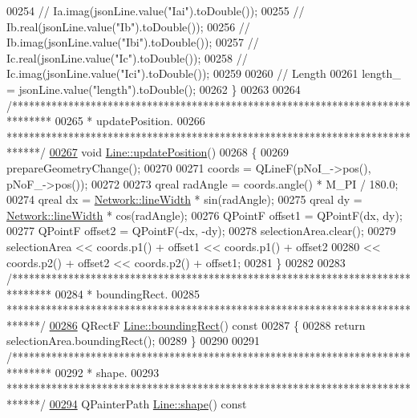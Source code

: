 \begin{DoxyCode}
00254 \textcolor{comment}{//  Ia.imag(jsonLine.value("Iai").toDouble());}
00255 \textcolor{comment}{//  Ib.real(jsonLine.value("Ib").toDouble());}
00256 \textcolor{comment}{//  Ib.imag(jsonLine.value("Ibi").toDouble());}
00257 \textcolor{comment}{//  Ic.real(jsonLine.value("Ic").toDouble());}
00258 \textcolor{comment}{//  Ic.imag(jsonLine.value("Ici").toDouble());}
00259 
00260   \textcolor{comment}{// Length}
00261   length\_ = jsonLine.value(\textcolor{stringliteral}{"length"}).toDouble();
00262 \}
00263 
00264 \textcolor{comment}{/*******************************************************************************}
00265 \textcolor{comment}{ * updatePosition.}
00266 \textcolor{comment}{ ******************************************************************************/}
\hypertarget{line_8cpp_source_l00267}{}\hyperlink{group___models_ga8fdb12651d4bc592616d241386b066b3}{00267} \textcolor{keywordtype}{void} \hyperlink{group___models_ga8fdb12651d4bc592616d241386b066b3}{Line::updatePosition}()
00268 \{
00269   prepareGeometryChange();
00270 
00271   coords = QLineF(pNoI\_->pos(), pNoF\_->pos());
00272 
00273   qreal radAngle = coords.angle() * M\_PI / 180.0;
00274   qreal dx = \hyperlink{group___graphics_ga3f810634c9908d62d33a1ab09a76c147}{Network::lineWidth} * sin(radAngle);
00275   qreal dy = \hyperlink{group___graphics_ga3f810634c9908d62d33a1ab09a76c147}{Network::lineWidth} * cos(radAngle);
00276   QPointF offset1 = QPointF(dx, dy);
00277   QPointF offset2 = QPointF(-dx, -dy);
00278   selectionArea.clear();
00279   selectionArea << coords.p1() + offset1 << coords.p1() + offset2
00280                 << coords.p2() + offset2 << coords.p2() + offset1;
00281 \}
00282 
00283 \textcolor{comment}{/*******************************************************************************}
00284 \textcolor{comment}{ * boundingRect.}
00285 \textcolor{comment}{ ******************************************************************************/}
\hypertarget{line_8cpp_source_l00286}{}\hyperlink{group___models_gad15c3af158d3b966c04be7e18cee5aea}{00286} QRectF \hyperlink{group___models_gad15c3af158d3b966c04be7e18cee5aea}{Line::boundingRect}()\textcolor{keyword}{ const}
00287 \textcolor{keyword}{}\{
00288   \textcolor{keywordflow}{return} selectionArea.boundingRect();
00289 \}
00290 
00291 \textcolor{comment}{/*******************************************************************************}
00292 \textcolor{comment}{ * shape.}
00293 \textcolor{comment}{ ******************************************************************************/}
\hypertarget{line_8cpp_source_l00294}{}\hyperlink{group___models_gaf1736b829a643d99052ef6428ddd5b16}{00294} QPainterPath \hyperlink{group___models_gaf1736b829a643d99052ef6428ddd5b16}{Line::shape}()\textcolor{keyword}{ const}

\end{DoxyCode}
